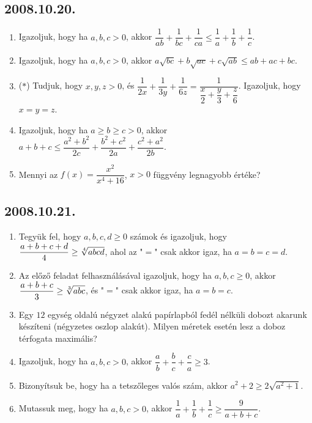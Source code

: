 \documentclass{article}
\begin{document}
\subsection*{2008.10.20.}
\begin{enumerate}
\item Igazoljuk, hogy ha $a,b,c>0$, akkor $\dfrac{1}{ab}+\dfrac{1}{bc}+\dfrac{1}{ca}\leq \dfrac{1}{a}+\dfrac{1}{b}+\dfrac{1}{c}$.
\item Igazoljuk, hogy ha $a,b,c>0$, akkor $a\sqrt{bc}+b\sqrt{ac}+c\sqrt{ab}\leq ab+ac+bc$.
\item ($*$) Tudjuk, hogy $x,y,z>0$, és $\dfrac{1}{2x}+\dfrac{1}{3y}+\dfrac{1}{6z}=\dfrac{1}{\dfrac{x}{2}+\dfrac{y}{3}+\dfrac{z}{6}}$. Igazoljuk, hogy $x=y=z$.
\item Igazoljuk, hogy ha $a\geq b\geq c>0$, akkor $a+b+c\leq \dfrac{a^2+b^2}{2c}+\dfrac{b^2+c^2}{2a}+\dfrac{c^2+a^2}{2b}$.
\item Mennyi az $f(x)=\dfrac{x^2}{x^4+16}$, $x>0$ függvény legnagyobb értéke?
\end{enumerate}
\subsection*{2008.10.21.}
\begin{enumerate}
\item Tegyük fel, hogy $a,b,c,d\geq 0$ számok és igazoljuk, hogy $\dfrac{a+b+c+d}{4}\geq \root4\of{abcd}$, ahol az "$=$" csak akkor igaz, ha $a=b=c=d$.
\item Az előző feladat felhasználásával igazoljuk, hogy ha $a,b,c\geq 0$, akkor $\dfrac{a+b+c}{3}\geq \root3\of{abc}$, és "$=$" csak akkor igaz, ha $a=b=c$.
\item Egy $12$ egység oldalú négyzet alakú papírlapból fedél nélküli dobozt akarunk készíteni (négyzetes oszlop alakút). Milyen méretek esetén lesz a doboz térfogata maximális?
\item Igazoljuk, hogy ha $a,b,c>0$, akkor $\dfrac{a}{b}+\dfrac{b}{c}+\dfrac{c}{a}\geq 3$.
\item Bizonyítsuk be, hogy ha a tetszőleges valós szám, akkor $a^2+2\geq 2\sqrt{a^2+1}$.
\item Mutassuk meg, hogy ha $a,b,c>0$, akkor $\dfrac{1}{a}+\dfrac{1}{b}+\dfrac{1}{c}\geq\dfrac{9}{a+b+c}$.
\end{enumerate}
\end{document}

